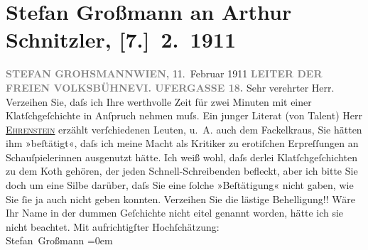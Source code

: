 

         
         \renewcommand{\erwaehntePersonen}{Personen: Albert Ehrenstein, Karl Kraus}
         \renewcommand{\erwaehnteInstitutionen}{Institutionen: Die Fackel, Wiener Freie Volksbühne}
         \renewcommand{\erwaehnteOrte}{Orte: Linke Wienzeile, Wien}
         \renewcommand{\erwaehnteWerke}{}
               \section[Stefan Großmann an Arthur Schnitzler, {[}7.{]} 2. 1911]{ Stefan Großmann an Arthur Schnitzler, {[}7.{]} 2. 1911}\nopagebreak{}\rehead{ }\begin{ledgroupsized}[t]{13cm}\normalsize\beginnumbering \toendnotes[C]{\smallbreak\pagebreak[2]} 
\pstart
           {\pb}\textcolor{gray}{\textbf{STEFAN GROHSMANN}}\hfill \textcolor{gray}{\textbf{WIEN,}}{ }11. Februar 1911\pend
           \pstart
           \textcolor{gray}{\textbf{LEITER DER FREIEN
                           VOLKSBÜHNE}}\hfill \textcolor{gray}{\textbf{VI. UFERGASSE 18.}}\pend
           \pstart\center{}Sehr verehrter Herr.\pend\pstart
           Verzeihen Sie, daſs ich Ihre werthvolle Zeit für zwei Minuten mit einer
               Klatſchgeſchichte  in Anſpruch nehmen muſs.\pend
           \pstart
           Ein junger Literat (von Talent) Herr \uline{\textsc{Ehrenstein}} erzählt verſchiedenen Leuten, u. A. auch dem Fackelkraus, Sie hätten ihm »beſtätigt«,
               daſs ich meine Macht als Kritiker zu erotiſchen Erpreſſungen an Schauſpielerinnen
               ausgenutzt hätte.\pend
           \pstart
           Ich weiß wohl, daſs derlei Klatſchgeſchichten zu dem Koth gehören, der jeden
               Schnell-Schreibenden befleckt, aber ich bitte Sie doch um eine Silbe darüber, daſs
               Sie eine ſolche »Beſtätigung« nicht gaben, wie Sie ſie ja auch nicht geben
               konnten.\pend
           \pstart
           Verzeihen Sie die lästige Behelligung!! Wäre Ihr Name in der dummen Geſchichte nicht
               eitel genannt worden, hätte ich sie nicht beachtet.\pend
           \pstart
           Mit aufrichtigſter Hochſchätzung:{\\[\baselineskip]}\spacefill\mbox{Stefan Großmann}\pend
           \leftskip=0em{}
         

\end{ledgroupsized}
